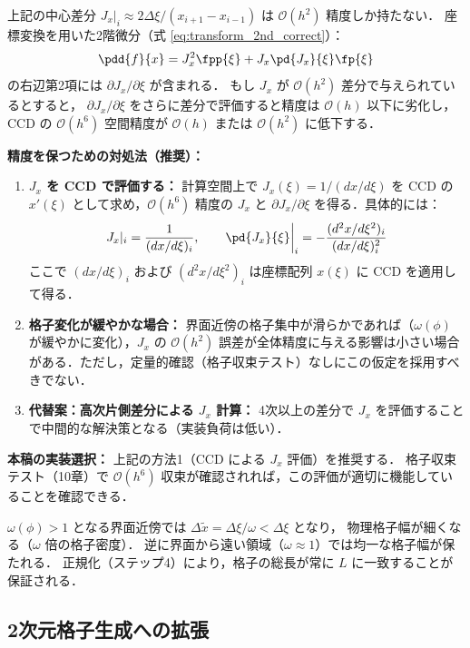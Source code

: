 \begin{tcolorbox}[warnbox, title={【重要】メトリクス係数 $J_x$ の精度と $\partial J_x/\partial\xi$ の評価}]
上記の中心差分 $J_x|_i \approx 2\Delta\xi/(x_{i+1}-x_{i-1})$ は $\mathcal{O}(h^2)$ 精度しか持たない．
座標変換を用いた2階微分（式 \eqref{eq:transform_2nd_correct}）：
\[
  \pdd{f}{x} = J_x^2 \fpp{\xi} + J_x \pd{J_x}{\xi} \fp{\xi}
\]
の右辺第2項には $\partial J_x/\partial \xi$ が含まれる．
もし $J_x$ が $\mathcal{O}(h^2)$ 差分で与えられているとすると，
$\partial J_x/\partial\xi$ をさらに差分で評価すると精度は $\mathcal{O}(h)$ 以下に劣化し，
CCD の $\mathcal{O}(h^6)$ 空間精度が $\mathcal{O}(h)$ または $\mathcal{O}(h^2)$ に低下する．

\textbf{精度を保つための対処法（推奨）：}
\begin{enumerate}
  \item \textbf{$J_x$ を CCD で評価する：} 計算空間上で $J_x(\xi) = 1/(dx/d\xi)$ を CCD の $x'(\xi)$ として求め，$\mathcal{O}(h^6)$ 精度の $J_x$ と $\partial J_x/\partial\xi$ を得る．具体的には：
  \[
    J_x|_i = \frac{1}{(dx/d\xi)_i}, \qquad
    \pd{J_x}{\xi}\bigg|_i = -\frac{(d^2x/d\xi^2)_i}{(dx/d\xi)_i^2}
  \]
  ここで $(dx/d\xi)_i$ および $(d^2x/d\xi^2)_i$ は座標配列 $x(\xi)$ に CCD を適用して得る．
  \item \textbf{格子変化が緩やかな場合：} 界面近傍の格子集中が滑らかであれば（$\omega(\phi)$ が緩やかに変化），$J_x$ の $\mathcal{O}(h^2)$ 誤差が全体精度に与える影響は小さい場合がある．ただし，定量的確認（格子収束テスト）なしにこの仮定を採用すべきでない．
  \item \textbf{代替案：高次片側差分による $J_x$ 計算：} 4次以上の差分で $J_x$ を評価することで中間的な解決策となる（実装負荷は低い）．
\end{enumerate}
\textbf{本稿の実装選択：} 上記の方法1（CCD による $J_x$ 評価）を推奨する．
格子収束テスト（10章）で $\mathcal{O}(h^6)$ 収束が確認されれば，この評価が適切に機能していることを確認できる．
\end{tcolorbox}

\begin{tcolorbox}[defbox, title={アルゴリズムの物理的直感}]
$\omega(\phi) > 1$ となる界面近傍では $\Delta\tilde{x} = \Delta\xi/\omega < \Delta\xi$ となり，
物理格子幅が細くなる（$\omega$ 倍の格子密度）．
逆に界面から遠い領域（$\omega \approx 1$）では均一な格子幅が保たれる．
正規化（ステップ4）により，格子の総長が常に $L$ に一致することが保証される．
\end{tcolorbox}

\subsection{2次元格子生成への拡張}
\label{sec:grid_2d}

